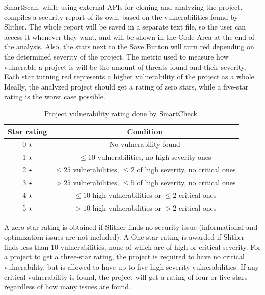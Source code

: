 SmartScan, while using external APIs for cloning and analyzing the project, compiles a security report of its own, based on the vulnerabilities found by Slither. The whole report will be saved in a separate text file, so the user can access it whenever they want, and will be shown in the Code Area at the end of the analysis. Also, the stars next to the Save Button will turn red depending on the determined severity of the project. The metric used to measure how vulnerable a project is will be the amount of threats found and their severity. Each star turning red represents a higher vulnerability of the project as a whole. Ideally, the analyzed project should get a rating of zero stars, while a five-star rating is the worst case possible.

\begin{table}[h]
\centering
\begin{tabular}{|c|c|}
\hline
Star rating & Condition                                                              \\ \hline
0 $\star$   & No vulnerability found                                                 \\ \hline
1 $\star$   & $\leq 10$ vulnerabilities, no high severity ones                       \\ \hline
2 $\star$   & $\leq 25$ vulnerabilities, $\leq 2$ of high severity, no critical ones \\ \hline
3 $\star$   & $> 25$ vulnerabilities, $\leq 5$ of high severity, no critical ones    \\ \hline
4 $\star$   & $\leq 10$ high vulnerabilities or $\leq 2$ critical ones               \\ \hline
5 $\star$   & $> 10$ high vulnerabilities or $> 2$ critical ones                     \\ \hline
\end{tabular}
\caption{Project vulnerability rating done by SmartCheck.}
\label{tab:my-table}
\end{table}

A zero-star rating is obtained if Slither finds no security issue (informational and optimization issues are not included). A One-star rating is awarded if Slither finds less than 10 vulnerabilities, none of which are of high or critical severity. For a project to get a three-star rating, the project is required to have no critical vulnerability, but is allowed to have up to five high severity vulnerabilities. If any critical vulnerability is found, the project will get a rating of four or five stars regardless of how many issues are found.

